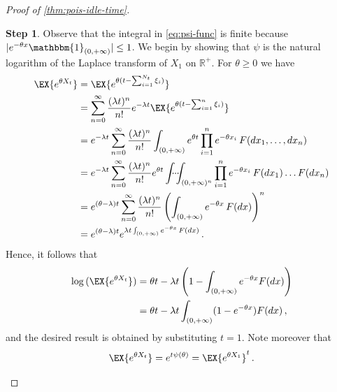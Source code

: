 \documentclass[titlepage]{article}
\theoremstyle{plain}
\theoremstyle{definition}
\newtheorem{proofpart}{Step}
\begin{document}
\begin{proof}[Proof of \cref{thm:pois-idle-time}]
  \begin{proofpart}
    Observe that the integral in \cref{eq:psi-func} is finite because $\vert e^{-\theta x} \mathbbm{1}_{(0, +\infty)} \vert \leq 1$. We begin by showing that $\psi$ is the natural logarithm of the Laplace transform of $X_1$ on $\mathbb{R}^+$. For $\theta \geq 0$ we have
    \begin{align}
      \EX{e^{\theta X_t}} & = \EX{e^{\theta (t - \sum_{i = 1}^{N_t} \xi_i)}}                                                                                                               \\
                          & = \sum_{n = 0}^\infty \frac{(\lambda t)^n}{n!} e^{-\lambda t} \EX{e^{\theta (t - \sum_{i = 1}^n \xi_i)}}                                                       \\
                          & = e^{-\lambda t} \sum_{n = 0}^\infty \frac{(\lambda t)^n}{n!}  \int_{(0, +\infty)} e^{\theta t} \prod_{i = 1}^n e^{-\theta x_i} \, F(dx_1, \dots, dx_n)        \\
                          & = e^{-\lambda t} \sum_{n = 0}^\infty \frac{(\lambda t)^n}{n!} e^{\theta t} \idotsint_{(0, +\infty)^n} \prod_{i = 1}^n e^{-\theta x_i} \, F(dx_1) \dots F(dx_n) \\
                          & = e^{(\theta - \lambda) t} \sum_{n = 0}^\infty \frac{(\lambda t)^n}{n!} \left( \int_{(0, +\infty)} e^{-\theta x} \, F(dx) \right)^n                            \\
                          & = e^{(\theta - \lambda) t} e^{\lambda t \int_{(0, +\infty)} e^{-\theta x} \, F(dx)} \,.
    \end{align}
    Hence, it follows that
    \begin{align}
      \log{(\EX{e^{\theta X_t}})} & = \theta t - \lambda t \left( 1 -  \int_{(0, +\infty)} e^{-\theta x} F(dx) \right) \\
                                  & = \theta t - \lambda t \int_{(0, +\infty)} (1 - e^{-\theta x}) F(dx) \,,
    \end{align}
    and the desired result is obtained by substituting $t = 1$. Note moreover that
    \begin{equation} \label{eq:laplace-time-scaling}
      \EX{e^{\theta X_t}} = e^{t \psi(\theta)} = \EX{e^{\theta X_1}}^t \,.
    \end{equation}


\end{proofpart}
\end{proof}
\end{document}
